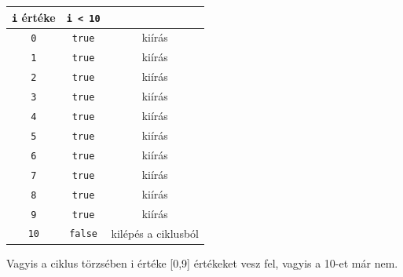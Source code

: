 \documentclass[a4paper]{article}
\begin{document}
	\begin{center}
		\begin{tabular}{||c | c | c||} 
			\hline
			\lstinline[]$i$ értéke & \lstinline[]$i < 10$ &  \\ %
			\hline\hline
			\lstinline[]$0$ & \lstinline[]$true$ & kiírás \\
			\hline
			\lstinline[]$1$ & \lstinline[]$true$ & kiírás \\
			\hline
			\lstinline[]$2$ & \lstinline[]$true$ & kiírás \\
			\hline
			\lstinline[]$3$ & \lstinline[]$true$ & kiírás \\
			\hline
			\lstinline[]$4$ & \lstinline[]$true$ & kiírás \\
			\hline
			\lstinline[]$5$ & \lstinline[]$true$ & kiírás \\
			\hline
			\lstinline[]$6$ & \lstinline[]$true$ & kiírás \\
			\hline
			\lstinline[]$7$ & \lstinline[]$true$ & kiírás \\
			\hline
			\lstinline[]$8$ & \lstinline[]$true$ & kiírás \\
			\hline
			\lstinline[]$9$ & \lstinline[]$true$ & kiírás \\
			\hline
			\lstinline[]$10$ & \lstinline[]$false$ & kilépés a ciklusból \\
			\hline
		\end{tabular}
	\end{center}
	
	Vagyis a ciklus törzsében i értéke [0,9] értékeket vesz fel, vagyis a 10-et már nem.
	
\end{document}
